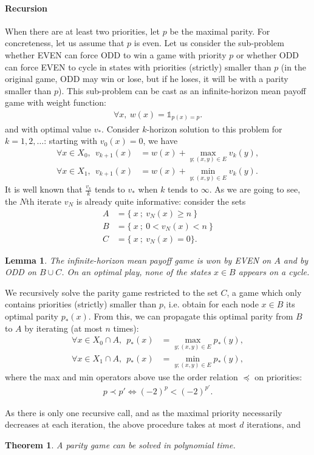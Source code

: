 \documentclass{article}
\newtheorem{theorem}{Theorem}
\newtheorem{lemma}{Lemma}
\def\1{{\mathds 1}}
\begin{document}
\paragraph{Recursion} When there are at least two priorities, let $p$ be the maximal parity. For concreteness, let us assume that $p$ is even.
Let us consider the sub-problem whether EVEN can force ODD to win a game with priority $p$ or whether ODD can force EVEN to cycle in states with priorities (strictly) smaller than $p$ (in the original game, ODD may win or lose, but if he loses, it will be with a parity smaller than $p$). This sub-problem can be cast as an infinite-horizon mean payoff game with weight function:
\begin{align}
  \forall x,~ w(x) = \1_{p(x)=p}.
\end{align}
and with optimal value $v_*$.
Consider $k$-horizon solution to this problem for $k=1,2,\dots$: starting with $v_0(x)=0$, we have
\begin{align}
  \forall x \in X_0, ~~v_{k+1}(x) & = w(x) + \max_{y;(x,y)\in E} v_k(y), \\
  \forall x \in X_1, ~~v_{k+1}(x) & = w(x) + \min_{y;(x,y)\in E} v_k(y).
\end{align}
It is well known that $\frac{v_k}{k}$ tends to $v_*$ when $k$ tends to $\infty$. As we are going to see, the $N$th iterate $v_N$ is already quite informative:
consider the sets
\begin{align}
 A &= \{~ x ~;~ v_N(x) \ge n ~\}\\
 B &= \{~ x ~;~ 0 < v_N(x) < n ~\}\\
 C & = \{~ x ~;~ v_N(x)=0 \}.
\end{align}
\begin{lemma}
  The infinite-horizon mean payoff game is won by EVEN on $A$ and by ODD on $B \cup C$. On an optimal play, none of the states $x \in B$ appears on a cycle. 
\end{lemma}

We recursively solve the parity game restricted to the set $C$, a game which only contains priorities (strictly) smaller than $p$, i.e. obtain for each node $x \in B$ its optimal parity $p_*(x)$. From this, we can propagate this optimal parity from $B$ to $A$ by iterating (at most $n$ times):
\begin{align}
  \forall x \in X_0 \cap A, ~~ p_*(x) &= \max_{y;(x,y)\in E} p_*(y), \\
  \forall x \in X_1 \cap A, ~~ p_*(x) &= \min_{y;(x,y)\in E} p_*(y),
\end{align}
where the max and min operators above use the order relation $\preceq$ on priorities:
\begin{align}
  p \prec p' \Leftrightarrow (-2)^{p}<(-2)^{p'}.  
\end{align}

As there is only one recursive call, and as the maximal priority necessarily decreases at each iteration, the above procedure takes at most $d$ iterations, and
\begin{theorem}
A parity game can be solved in polynomial time.
\end{theorem}



 
\end{document}

